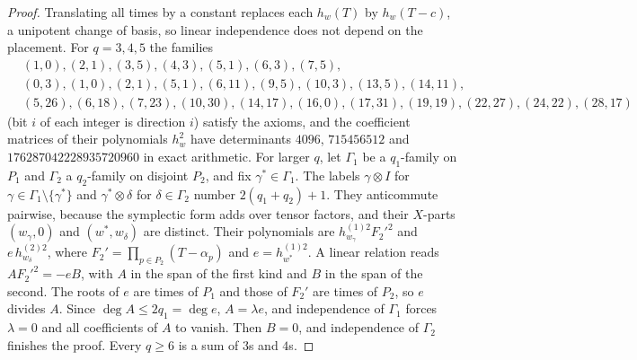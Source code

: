 \documentclass[11pt]{article}
\begin{document}
\begin{proof}
Translating all times by a constant replaces each $h_w(T)$ by $h_w(T-c)$, a unipotent change of basis, so linear independence does not depend on the placement. For $q=3,4,5$ the families
\begin{align*}
&(1,0),(2,1),(3,5),(4,3),(5,1),(6,3),(7,5),\\
&(0,3),(1,0),(2,1),(5,1),(6,11),(9,5),(10,3),(13,5),(14,11),\\
&(5,26),(6,18),(7,23),(10,30),(14,17),(16,0),(17,31),(19,19),(22,27),(24,22),(28,17)
\end{align*}
(bit $i$ of each integer is direction $i$) satisfy the axioms, and the coefficient matrices of their polynomials $h_w^2$ have determinants $4096$, $715456512$ and $176287042228935720960$ in exact arithmetic. For larger $q$, let $\Gamma_1$ be a $q_1$-family on $P_1$ and $\Gamma_2$ a $q_2$-family on disjoint $P_2$, and fix $\gamma^*\in\Gamma_1$. The labels $\gamma\otimes I$ for $\gamma\in\Gamma_1\setminus\{\gamma^*\}$ and $\gamma^*\otimes\delta$ for $\delta\in\Gamma_2$ number $2(q_1+q_2)+1$. They anticommute pairwise, because the symplectic form adds over tensor factors, and their $X$-parts $(w_\gamma,0)$ and $(w^*,w_\delta)$ are distinct. Their polynomials are $h^{(1)2}_{w_\gamma}F_2'^2$ and $e\,h^{(2)2}_{w_\delta}$, where $F_2'=\prod_{p\in P_2}(T-\alpha_p)$ and $e=h^{(1)2}_{w^*}$. A linear relation reads $AF_2'^2=-eB$, with $A$ in the span of the first kind and $B$ in the span of the second. The roots of $e$ are times of $P_1$ and those of $F_2'$ are times of $P_2$, so $e$ divides $A$. Since $\deg A\le2q_1=\deg e$, $A=\lambda e$, and independence of $\Gamma_1$ forces $\lambda=0$ and all coefficients of $A$ to vanish. Then $B=0$, and independence of $\Gamma_2$ finishes the proof. Every $q\ge6$ is a sum of $3$s and $4$s.
\end{proof}
\end{document}
